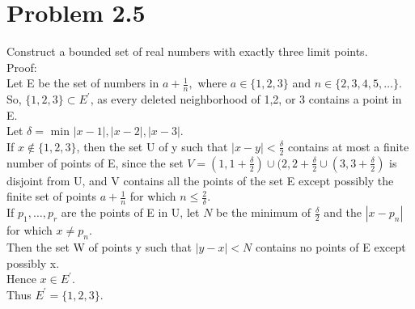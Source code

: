 \section{Problem 2.5}
Construct a bounded set of real numbers with exactly three limit points. \\
Proof:\\ 
Let E be the set of numbers in $a+ \frac{1}{n},$ where $a \in \{1,2,3\}$ and $n \in \{2,3,4,5, \dots\}.$\\
So, $\{1,2,3\} \subset E^'$, as every deleted neighborhood of 1,2, or 3 contains a point in E.\\
 Let $\delta =$ min ${|x-1|,|x-2|,|x-3|}.$\\
 If $x \notin \{1,2,3\}$, then the set U of y such that $|x-y|< \frac{\delta}{2}$ contains at most a finite number of points of E, since the set $V=(1,1+\frac{\delta}{2}) \cup (2,2+\frac{\delta}{2} \cup (3,3+\frac{\delta}{2})$ is disjoint from U, and V contains all the points of the set E except possibly the finite set of points $a + \frac{1}{n}$ for which $n \leq \frac{2}{\delta}.$ \\
 If $p_1, \dots, p_r$ are the points of E in U, let $N$ be the minimum of $\frac{\delta}{2}$ and the $|x-p_n|$ for which $x \neq p_n.$ \\
 Then the set W of points y such that $|y-x|< N$ contains no points of E except possibly x. \\
 Hence $x \in E^'.$ \\
 Thus $E^{'}=\{1,2,3\}.$


